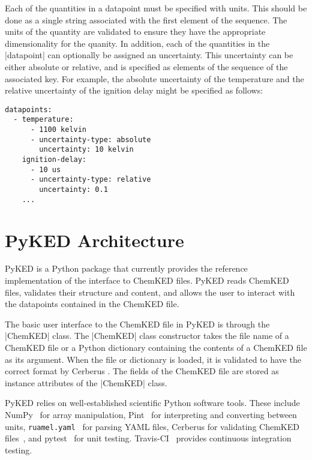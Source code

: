 \documentclass[12pt]{ussci}
\newcommand\ck{ChemKED}
\newcommand\pk{PyKED}
\begin{document}
Each of the quantities in a datapoint must be specified with units. This should
be done as a single string associated with the first element of the sequence.
The units of the quantity are validated to ensure they have the appropriate
dimensionality for the quanity. In addition, each of the quantities in the
\yaml|datapoint| can optionally be assigned an uncertainty. This uncertainty can
be either absolute or relative, and is specified as elements of the sequence of
the associated key. For example, the absolute uncertainty of the temperature and
the relative uncertainty of the ignition delay might be specified as follows:

\begin{verbatim}
datapoints:
  - temperature:
      - 1100 kelvin
      - uncertainty-type: absolute
        uncertainty: 10 kelvin
    ignition-delay:
      - 10 us
      - uncertainty-type: relative
        uncertainty: 0.1
    ...
\end{verbatim}

\section{PyKED Architecture}
%
\pk{} is a Python package that currently provides the reference implementation
of the interface to \ck{} files. \pk{} reads \ck{} files, validates their
structure and content, and allows the user to interact with the datapoints
contained in the \ck{} file.

The basic user interface to the \ck{} file in \pk{} is through the
\python|ChemKED| class. The \python|ChemKED| class constructor takes the file
name of a \ck{} file or a Python dictionary containing the contents of a \ck{}
file as its argument. When the file or dictionary is loaded, it is validated to
have the correct format by Cerberus \autocite{cerberus}. The fields of the \ck{}
file are stored as instance attributes of the \python|ChemKED| class.

\pk{} relies on well-established scientific Python software tools. These include
NumPy~\autocite{vanderWalt:2011np} for array manipulation,
Pint~\autocite{Grecco2016} for interpreting and converting between units,
\texttt{ruamel.yaml}~\autocite{ruamel_yaml} for parsing YAML files, Cerberus for
validating \ck{} files~\autocite{cerberus}, and pytest~\autocite{pytest:3.0.1}
for unit testing. Travis-CI~\autocite{Travis2016} provides continuous
integration testing.
\end{document}
